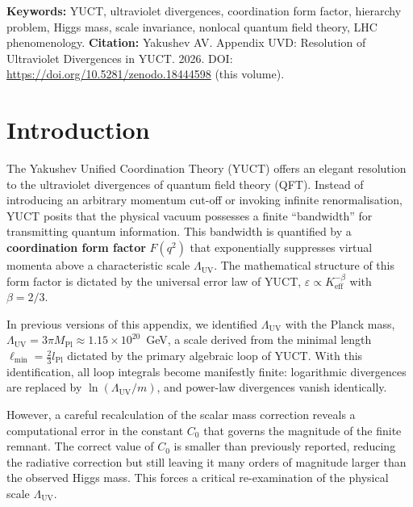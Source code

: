 \documentclass[12pt,a4paper]{article}
\newcommand{\Mpl}{M_{\mathrm{Pl}}}
\newcommand{\Lpl}{l_{\mathrm{Pl}}}
\newcommand{\Lmin}{\ell_{\min}}
\newcommand{\LUV}{\Lambda_{\mathrm{UV}}}
\theoremstyle{remark}
\begin{document}
	\vspace{0.2cm}
	\noindent
	{\color{darkblue}\textbf{Keywords:}} YUCT, ultraviolet divergences, coordination form factor, hierarchy problem, Higgs mass, scale invariance, nonlocal quantum field theory, LHC phenomenology.
	\vspace{0.1cm}
	\noindent
	{\color{darkblue}\textbf{Citation:}} Yakushev AV. Appendix UVD: Resolution of Ultraviolet Divergences in YUCT. 2026. DOI: \url{https://doi.org/10.5281/zenodo.18444598} (this volume).
	
	\vspace{0.5cm}
	
	\section{Introduction}
	\label{sec:intro}
	
	The Yakushev Unified Coordination Theory (YUCT) offers an elegant resolution to the ultraviolet divergences of quantum field theory (QFT).  Instead of introducing an arbitrary momentum cut-off or invoking infinite renormalisation, YUCT posits that the physical vacuum possesses a finite ``bandwidth'' for transmitting quantum information.  This bandwidth is quantified by a \textbf{coordination form factor} \(F(q^2)\) that exponentially suppresses virtual momenta above a characteristic scale \(\LUV\).  The mathematical structure of this form factor is dictated by the universal error law of YUCT, \(\varepsilon \propto K_{\mathrm{eff}}^{-\beta}\) with \(\beta = 2/3\).
	
	In previous versions of this appendix, we identified \(\LUV\) with the Planck mass, \(\LUV = 3\pi\Mpl \approx 1.15\times 10^{20}\)~GeV, a scale derived from the minimal length \(\Lmin = \frac{2}{3}\Lpl\) dictated by the primary algebraic loop of YUCT.  With this identification, all loop integrals become manifestly finite: logarithmic divergences are replaced by \(\ln(\LUV/m)\), and power-law divergences vanish identically.
	
	However, a careful recalculation of the scalar mass correction reveals a computational error in the constant \(C_0\) that governs the magnitude of the finite remnant.  The correct value of \(C_0\) is smaller than previously reported, reducing the radiative correction but still leaving it many orders of magnitude larger than the observed Higgs mass.  This forces a critical re-examination of the physical scale \(\LUV\).
	
\end{document}
